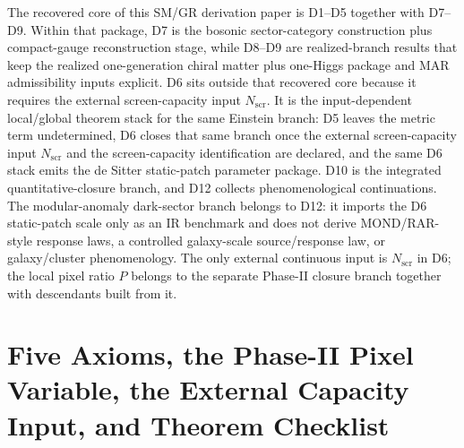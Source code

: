 \documentclass[11pt]{article}
\begin{document}
The recovered core of this SM/GR derivation paper is D1--D5 together with D7--D9. Within that package, D7 is the bosonic sector-category construction plus compact-gauge reconstruction stage, while D8--D9 are realized-branch results that keep the realized one-generation chiral matter plus one-Higgs package and MAR admissibility inputs explicit. D6 sits outside that recovered core because it requires the external screen-capacity input \(N_{\mathrm{scr}}\). It is the input-dependent local/global theorem stack for the same Einstein branch: D5 leaves the metric term undetermined, D6 closes that same branch once the external screen-capacity input \(N_{\mathrm{scr}}\) and the screen-capacity identification are declared, and the same D6 stack emits the de Sitter static-patch parameter package. D10 is the integrated quantitative-closure branch, and D12 collects phenomenological continuations. The modular-anomaly dark-sector branch belongs to D12: it imports the D6 static-patch scale only as an IR benchmark and does not derive MOND/RAR-style response laws, a controlled galaxy-scale source/response law, or galaxy/cluster phenomenology. The only external continuous input is \(N_{\mathrm{scr}}\) in D6; the local pixel ratio \(P\) belongs to the separate Phase-II closure branch together with descendants built from it.
\section{Five Axioms, the Phase-II Pixel Variable, the External Capacity Input, and Theorem Checklist}\label{sec:theorem-ledger}
\end{document}
